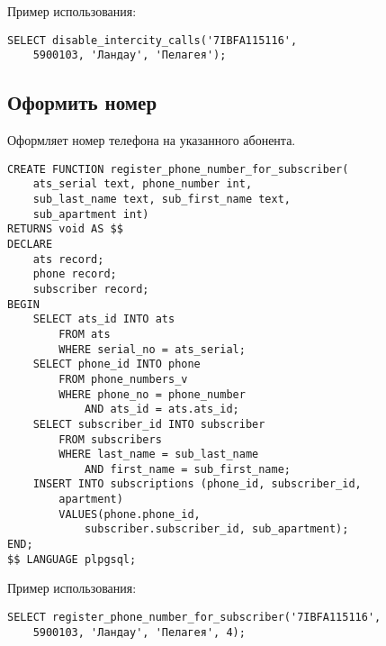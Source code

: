 \documentclass{report}
\begin{document}
Пример использования:
\begin{lstlisting}
SELECT disable_intercity_calls('7IBFA115116',
    5900103, 'Ландау', 'Пелагея');
\end{lstlisting}

\subsection*{Оформить номер}

Оформляет номер телефона на указанного абонента.

\begin{lstlisting}
CREATE FUNCTION register_phone_number_for_subscriber(
    ats_serial text, phone_number int, 
    sub_last_name text, sub_first_name text, 
    sub_apartment int) 
RETURNS void AS $$
DECLARE
    ats record;
    phone record;
    subscriber record;
BEGIN
    SELECT ats_id INTO ats 
        FROM ats 
        WHERE serial_no = ats_serial;
    SELECT phone_id INTO phone
        FROM phone_numbers_v
        WHERE phone_no = phone_number
            AND ats_id = ats.ats_id;
    SELECT subscriber_id INTO subscriber
        FROM subscribers
        WHERE last_name = sub_last_name
            AND first_name = sub_first_name;
    INSERT INTO subscriptions (phone_id, subscriber_id, 
        apartment)
        VALUES(phone.phone_id, 
            subscriber.subscriber_id, sub_apartment);
END;
$$ LANGUAGE plpgsql;
\end{lstlisting}

Пример использования:
\begin{lstlisting}
SELECT register_phone_number_for_subscriber('7IBFA115116',
    5900103, 'Ландау', 'Пелагея', 4);
\end{lstlisting}
\end{document}
